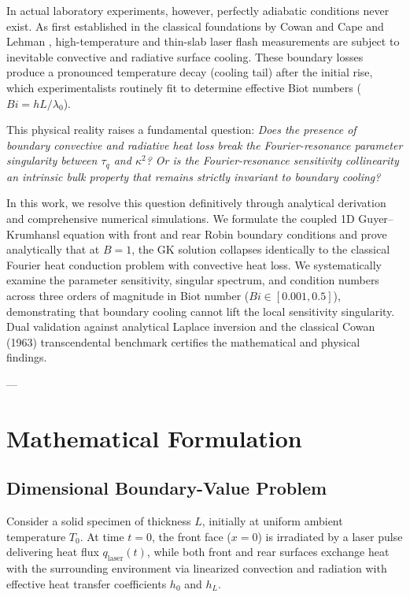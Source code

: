 \documentclass[review,12pt]{article}
\begin{document}
In actual laboratory experiments, however, perfectly adiabatic conditions never exist. As first established in the classical foundations by Cowan \cite{cowan1963pulse} and Cape and Lehman \cite{cape1963temperature}, high-temperature and thin-slab laser flash measurements are subject to inevitable convective and radiative surface cooling. These boundary losses produce a pronounced temperature decay (cooling tail) after the initial rise, which experimentalists routinely fit to determine effective Biot numbers ($Bi = h L / \lambda_0$). 

This physical reality raises a fundamental question: \textit{Does the presence of boundary convective and radiative heat loss break the Fourier-resonance parameter singularity between $\tau_q$ and $\kappa^2$? Or is the Fourier-resonance sensitivity collinearity an intrinsic bulk property that remains strictly invariant to boundary cooling?}

In this work, we resolve this question definitively through analytical derivation and comprehensive numerical simulations. We formulate the coupled 1D Guyer--Krumhansl equation with front and rear Robin boundary conditions and prove analytically that at $B = 1$, the GK solution collapses identically to the classical Fourier heat conduction problem with convective heat loss. We systematically examine the parameter sensitivity, singular spectrum, and condition numbers across three orders of magnitude in Biot number ($Bi \in [0.001, 0.5]$), demonstrating that boundary cooling cannot lift the local sensitivity singularity. Dual validation against analytical Laplace inversion and the classical Cowan (1963) transcendental benchmark certifies the mathematical and physical findings.

---

\section{Mathematical Formulation}

\subsection{Dimensional Boundary-Value Problem}

Consider a solid specimen of thickness $L$, initially at uniform ambient temperature $T_0$. At time $t = 0$, the front face ($x = 0$) is irradiated by a laser pulse delivering heat flux $q_{\mathrm{laser}}(t)$, while both front and rear surfaces exchange heat with the surrounding environment via linearized convection and radiation with effective heat transfer coefficients $h_0$ and $h_L$.
\end{document}
